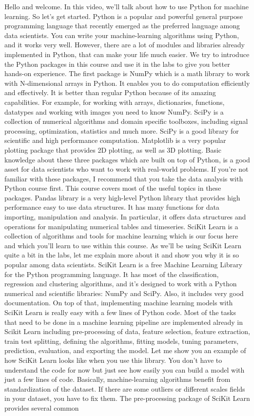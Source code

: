 	Hello and welcome. In this video, we'll talk about how to use Python for machine learning. So let's get started. Python is a popular and powerful general purpose programming language that recently emerged as the preferred language among data scientists. You can write your machine-learning algorithms using Python, and it works very well. However, there are a lot of modules and libraries already implemented in Python, that can make your life much easier. We try to introduce the Python packages in this course and use it in the labs to give you better hands-on experience. The first package is NumPy which is a math library to work with N-dimensional arrays in Python. It enables you to do computation efficiently and effectively. It is better than regular Python because of its amazing capabilities. For example, for working with arrays, dictionaries, functions, datatypes and working with images you need to know NumPy. SciPy is a collection of numerical algorithms and domain specific toolboxes, including signal processing, optimization, statistics and much more. SciPy is a good library for scientific and high performance computation. Matplotlib is a very popular plotting package that provides 2D plotting, as well as 3D plotting. Basic knowledge about these three packages which are built on top of Python, is a good asset for data scientists who want to work with real-world problems. If you're not familiar with these packages, I recommend that you take the data analysis with Python course first. This course covers most of the useful topics in these packages. Pandas library is a very high-level Python library that provides high performance easy to use data structures. It has many functions for data importing, manipulation and analysis. In particular, it offers data structures and operations for manipulating numerical tables and timeseries. SciKit Learn is a collection of algorithms and tools for machine learning which is our focus here and which you'll learn to use within this course. As we'll be using SciKit Learn quite a bit in the labs, let me explain more about it and show you why it is so popular among data scientists. SciKit Learn is a free Machine Learning Library for the Python programming language. It has most of the classification, regression and clustering algorithms, and it's designed to work with a Python numerical and scientific libraries: NumPy and SciPy. Also, it includes very good documentation. On top of that, implementing machine learning models with SciKit Learn is really easy with a few lines of Python code. Most of the tasks that need to be done in a machine learning pipeline are implemented already in Scikit Learn including pre-processing of data, feature selection, feature extraction, train test splitting, defining the algorithms, fitting models, tuning parameters, prediction, evaluation, and exporting the model. Let me show you an example of how SciKit Learn looks like when you use this library. You don't have to understand the code for now but just see how easily you can build a model with just a few lines of code. Basically, machine-learning algorithms benefit from standardization of the dataset. If there are some outliers or different scales fields in your dataset, you have to fix them. The pre-processing package of SciKit Learn provides several common 